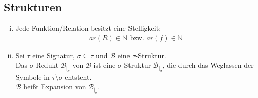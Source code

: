 \documentclass[a4paper,10pt]{article}
\newcommand{\N}{\mathbb{N}}
\begin{document}
	\subsection*{Strukturen}
		\begin{enumerate}[(i)]
				\item	
					Jede Funktion/Relation besitzt eine Stelligkeit:
					\begin{align*}
						ar(R) \in \N \text{ bzw. } ar(f) \in \N
					\end{align*}
					
				\item
					Sei $\tau$ eine Signatur, $\sigma \subseteq \tau$ und $\mathcal{B}$ eine $\tau$-Struktur.\\
					Das $\sigma$-Redukt $\mathcal{B}_{|_{\sigma}}$ von $\mathcal{B}$ ist eine $\sigma$-Struktur $\mathcal{B}_{|_{\sigma}}$, die 						durch das Weglassen der Symbole in $\tau \setminus \sigma$ entsteht. \\ 
					$\mathcal{B}$ heißt Expansion von $\mathcal{B}_{|_{\sigma}}$.
		\end{enumerate}
	
\end{document}
